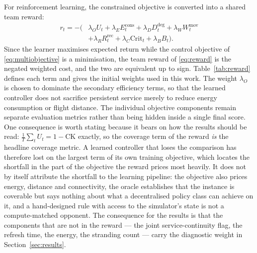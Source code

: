 \documentclass[conference]{IEEEtran}
\begin{document}
For reinforcement learning, the constrained objective is converted into a shared team reward:
\begin{equation}
\begin{aligned}
r_t=-\big(&\lambda_O U_t+\lambda_E E_t^{\mathrm{cons}}+
          \lambda_D D_t^{\mathrm{deg}}+\lambda_W W_t^{\mathrm{mov}}\\
&+\lambda_R R_t^{\mathrm{rec}}+\lambda_C\mathrm{Crit}_t+\lambda_B B_t\big).
\end{aligned}
\label{eq:reward}
\end{equation}
Since the learner maximises expected return while the control objective of \eqref{eq:multiobjective} is a minimisation, the team reward of \eqref{eq:reward} is the negated weighted cost, and the two are equivalent up to sign. Table~\ref{tab:reward} defines each term and gives the initial weights used in this work. The weight $\lambda_O$ is chosen to dominate the secondary efficiency terms, so that the learned controller does not sacrifice persistent service merely to reduce energy consumption or flight distance. The individual objective components remain separate evaluation metrics rather than being hidden inside a single final score.  One consequence is worth stating because it bears on how the results should be read: $\frac1T\sum_t U_t = 1-\mathrm{CK}$ exactly, so the coverage term of the reward \emph{is} the headline coverage metric.  A learned controller that loses the comparison has therefore lost on the largest term of its own training objective, which locates the shortfall in the part of the objective the reward prices most heavily.  It does not by itself attribute the shortfall to the learning pipeline: the objective also prices energy, distance and connectivity, the oracle establishes that the instance is coverable but says nothing about what a decentralised policy class can achieve on it, and a hand-designed rule with access to the simulator's state is not a compute-matched opponent.  The consequence for the results is that the components that are not in the reward --- the joint service-continuity flag, the refresh time, the energy, the stranding count --- carry the diagnostic weight in Section~\ref{sec:results}.
\end{document}

